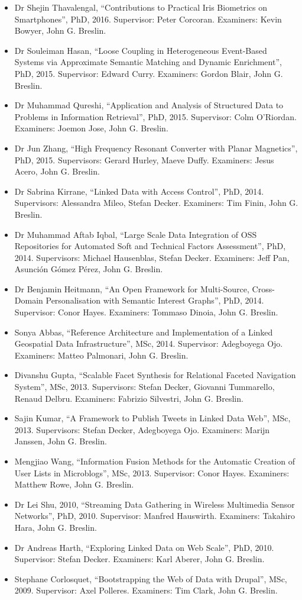 \documentclass[10pt,a4paper]{res} %
\begin{document}
\begin{resume}
\begin{itemize}
\item Dr Shejin Thavalengal, ``Contributions to Practical Iris Biometrics on Smartphones'', PhD, 2016. Supervisor: Peter Corcoran. Examiners: Kevin Bowyer, John G. Breslin.
\item Dr Souleiman Hasan, ``Loose Coupling in Heterogeneous Event-Based Systems via Approximate Semantic Matching and Dynamic Enrichment'', PhD, 2015. Supervisor: Edward Curry. Examiners: Gordon Blair, John G. Breslin.
\item Dr Muhammad Qureshi, ``Application and Analysis of Structured Data to Problems in Information Retrieval'', PhD, 2015. Supervisor: Colm O'Riordan. Examiners: Joemon Jose, John G. Breslin.
\item Dr Jun Zhang, ``High Frequency Resonant Converter with Planar Magnetics'', PhD, 2015. Supervisors: Gerard Hurley, Maeve Duffy. Examiners: Jesus Acero, John G. Breslin.
\item Dr Sabrina Kirrane, ``Linked Data with Access Control'', PhD, 2014. Supervisors: Alessandra Mileo, Stefan Decker. Examiners: Tim Finin, John G. Breslin.
\item Dr Muhammad Aftab Iqbal, ``Large Scale Data Integration of OSS Repositories for Automated Soft and Technical Factors Assessment'', PhD, 2014. Supervisors: Michael Hausenblas, Stefan Decker. Examiners: Jeff Pan, Asunci\'{o}n G\'{o}mez P\'{e}rez, John G. Breslin.
\item Dr Benjamin Heitmann, ``An Open Framework for Multi-Source, Cross-Domain Personalisation with Semantic Interest Graphs'', PhD, 2014. Supervisor: Conor Hayes. Examiners: Tommaso Dinoia, John G. Breslin.
\item Sonya Abbas, ``Reference Architecture and Implementation of a Linked Geospatial Data Infrastructure'', MSc, 2014. Supervisor: Adegboyega Ojo. Examiners: Matteo Palmonari, John G. Breslin.
\item Divanshu Gupta, ``Scalable Facet Synthesis for Relational Faceted Navigation System'', MSc, 2013. Supervisors: Stefan Decker, Giovanni Tummarello, Renaud Delbru. Examiners: Fabrizio Silvestri, John G. Breslin.
\item Sajin Kumar, ``A Framework to Publish Tweets in Linked Data Web'', MSc, 2013. Supervisors: Stefan Decker, Adegboyega Ojo. Examiners: Marijn Janssen, John G. Breslin.
\item Mengjiao Wang, ``Information Fusion Methods for the Automatic Creation of User Lists in Microblogs'', MSc, 2013. Supervisor: Conor Hayes. Examiners: Matthew Rowe, John G. Breslin.
\item Dr Lei Shu, 2010, ``Streaming Data Gathering in Wireless Multimedia Sensor Networks'', PhD, 2010. Supervisor: Manfred Hauswirth. Examiners: Takahiro Hara, John G. Breslin.
\item Dr Andreas Harth, ``Exploring Linked Data on Web Scale'', PhD, 2010. Supervisor: Stefan Decker. Examiners: Karl Aberer, John G. Breslin.
\item Stephane Corlosquet, ``Bootstrapping the Web of Data with Drupal'', MSc, 2009. Supervisor: Axel Polleres. Examiners: Tim Clark, John G. Breslin.
\end{itemize}


\end{resume}
\end{document}
